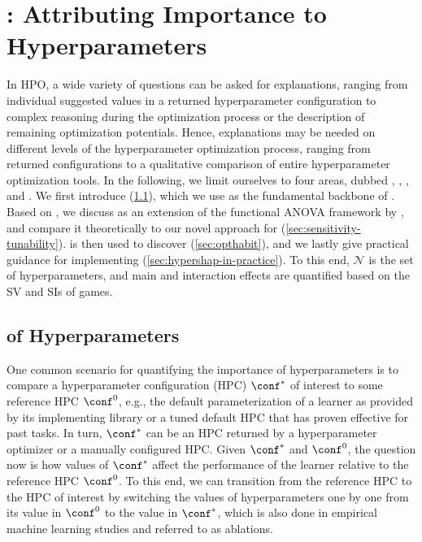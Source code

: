 \section{\tool: Attributing Importance to Hyperparameters}\label{sec:hpi-games}


In HPO, a wide variety of questions can be asked for explanations, ranging from individual suggested values in a returned hyperparameter configuration to complex reasoning during the optimization process or the description of remaining optimization potentials. Hence, explanations may be needed on different levels of the hyperparameter optimization process, ranging from returned configurations to a qualitative comparison of entire hyperparameter optimization tools. 
In the following, we limit ourselves to four areas, dubbed \ablation, \sensitivity, \tunability, and \opthabit.
We first introduce \ablation (\cref{sec:ablation}), which we use as the fundamental backbone of \tool.
Based on \ablation, we discuss \sensitivity as an extension of the functional ANOVA framework by \citet{fANOVA}, and compare it theoretically to our novel approach for \tunability (\cref{sec:sensitivity-tunability}).
\tunability is then used to discover \opthabit (\cref{sec:opthabit}), and we lastly give practical guidance for implementing \tool (\cref{sec:hypershap-in-practice}).
To this end, $\mathcal N$ is the set of hyperparameters, and main and interaction effects are quantified based on the \gls*{SV} and \glspl*{SI} of games.

\subsection{\ablation of Hyperparameters}\label{sec:ablation}

One common scenario for quantifying the importance of hyperparameters is to compare a hyperparameter configuration (HPC) $\conf^\ast$ of interest to some reference HPC $\conf^0$, e.g., the default parameterization of a learner as provided by its implementing library or a tuned default HPC that has proven effective for past tasks. In turn, $\conf^\ast$ can be an HPC returned by a hyperparameter optimizer or a manually configured HPC. Given $\conf^\ast$ and $\conf^0$, the question now is how values of $\conf^\ast$ affect the performance of the learner relative to the reference HPC $\conf^0$. To this end, we can transition from the reference HPC to the HPC of interest by switching the values of hyperparameters one by one from its value in $\conf^0$ to the value in $\conf^\ast$, which is also done in empirical machine learning studies and referred to as ablations.

